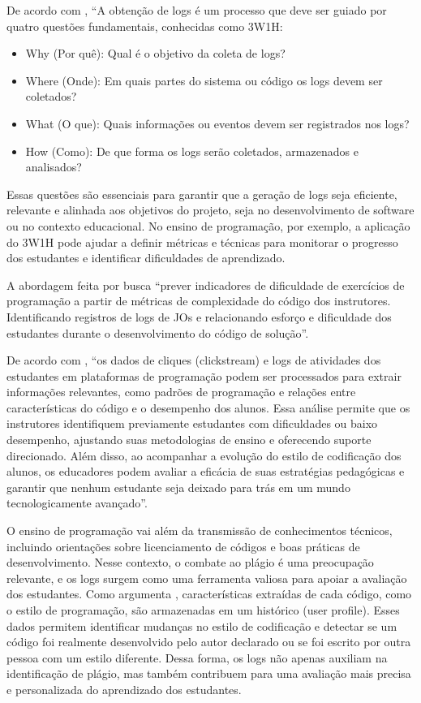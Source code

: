De acordo com \cite{gu2022logging}, ``A obtenção de logs é um processo que deve ser guiado por quatro questões fundamentais, conhecidas como 3W1H:

\begin{itemize}
    \item Why (Por quê): Qual é o objetivo da coleta de logs?
    \item Where (Onde): Em quais partes do sistema ou código os logs devem ser coletados?
    \item What (O que): Quais informações ou eventos devem ser registrados nos logs?
    \item How (Como): De que forma os logs serão coletados, armazenados e analisados?
\end{itemize}

Essas questões são essenciais para garantir que a geração de logs seja eficiente, relevante e alinhada aos objetivos do projeto, seja no desenvolvimento de software ou no contexto educacional. No ensino de programação, por exemplo, a aplicação do 3W1H pode ajudar a definir métricas e técnicas para monitorar o progresso dos estudantes e identificar dificuldades de aprendizado.

A abordagem feita por \cite{silva2022previsao} busca ``prever indicadores de dificuldade de exercícios de programação a partir de métricas de complexidade do código dos instrutores. Identificando registros de logs de JOs e relacionando esforço e dificuldade dos estudantes durante o desenvolvimento do código de solução''.

De acordo com \cite{gupta2024identification}, ``os dados de cliques (clickstream) e logs de atividades dos estudantes em plataformas de programação podem ser processados para extrair informações relevantes, como padrões de programação e relações entre características do código e o desempenho dos alunos. Essa análise permite que os instrutores identifiquem previamente estudantes com dificuldades ou baixo desempenho, ajustando suas metodologias de ensino e oferecendo suporte direcionado. Além disso, ao acompanhar a evolução do estilo de codificação dos alunos, os educadores podem avaliar a eficácia de suas estratégias pedagógicas e garantir que nenhum estudante seja deixado para trás em um mundo tecnologicamente avançado''.

O ensino de programação vai além da transmissão de conhecimentos técnicos, incluindo orientações sobre licenciamento de códigos e boas práticas de desenvolvimento. Nesse contexto, o combate ao plágio é uma preocupação relevante, e os logs surgem como uma ferramenta valiosa para apoiar a avaliação dos estudantes. Como argumenta \cite{arabyarmohamady2012coding}, características extraídas de cada código, como o estilo de programação, são armazenadas em um histórico (user profile). Esses dados permitem identificar mudanças no estilo de codificação e detectar se um código foi realmente desenvolvido pelo autor declarado ou se foi escrito por outra pessoa com um estilo diferente. Dessa forma, os logs não apenas auxiliam na identificação de plágio, mas também contribuem para uma avaliação mais precisa e personalizada do aprendizado dos estudantes.

